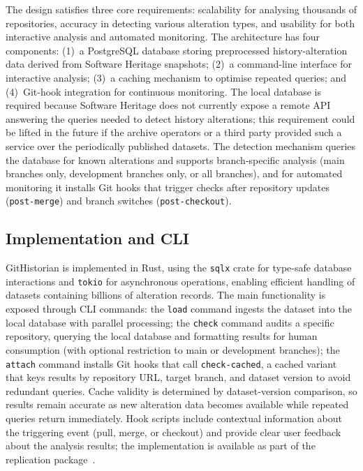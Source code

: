 The design satisfies three core requirements: scalability for analysing thousands of repositories, accuracy in detecting various alteration types, and usability for both interactive analysis and automated monitoring.
The architecture has four components: (1)~a PostgreSQL database storing preprocessed history-alteration data derived from Software Heritage snapshots; (2)~a command-line interface for interactive analysis; (3)~a caching mechanism to optimise repeated queries; and (4)~Git-hook integration for continuous monitoring.
The local database is required because Software Heritage does not currently expose a remote API answering the queries needed to detect history alterations; this requirement could be lifted in the future if the archive operators or a third party provided such a service over the periodically published datasets.
The detection mechanism queries the database for known alterations and supports branch-specific analysis (main branches only, development branches only, or all branches), and for automated monitoring it installs Git hooks that trigger checks after repository updates (\texttt{post-merge}) and branch switches (\texttt{post-checkout}).

\subsection{Implementation and CLI}
\label{subsec:hist-gh-workflow}

GitHistorian is implemented in Rust, using the \texttt{sqlx} crate for type-safe database interactions and \texttt{tokio} for asynchronous operations, enabling efficient handling of datasets containing billions of alteration records.
The main functionality is exposed through CLI commands:
the \texttt{load} command ingests the dataset into the local database with parallel processing;
the \texttt{check} command audits a specific repository, querying the local database and formatting results for human consumption (with optional restriction to main or development branches);
the \texttt{attach} command installs Git hooks that call \texttt{check-cached}, a cached variant that keys results by repository URL, target branch, and dataset version to avoid redundant queries.
Cache validity is determined by dataset-version comparison, so results remain accurate as new alteration data becomes available while repeated queries return immediately.
Hook scripts include contextual information about the triggering event (pull, merge, or checkout) and provide clear user feedback about the analysis results; the implementation is available as part of the replication package~\cite{replication-package-altered-histories}.

